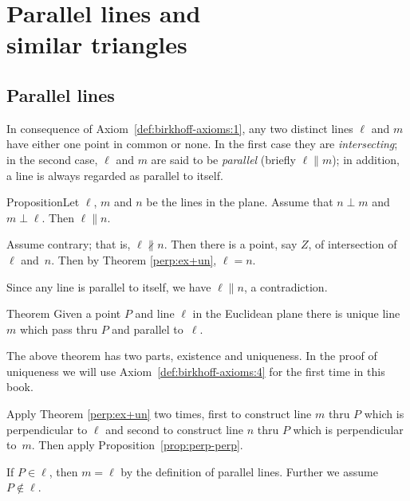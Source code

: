 \chapter[Parallel lines and similar triangles]{Parallel lines and\\ similar triangles}\label{chap:parallel}

\section*{Parallel lines}

In consequence of Axiom~\ref{def:birkhoff-axioms:1}, 
any two distinct lines $\ell$ and $m$ have either one point
in common or none. 
In the first case they are \emph{intersecting}; 
in the second case, $\ell$ and $m$ are said to be \emph{parallel} (briefly $\ell\parallel m$);
in addition, a line is always regarded as parallel to itself.


\begin{thm}{Proposition}\label{prop:perp-perp}Let $\ell$, $m$ and $n$ be the lines in the plane.
Assume that $n\perp m$ and $m\perp \ell$.
Then $\ell\parallel n$. 
\end{thm}

Assume contrary; 
that is, $\ell\nparallel n$.
Then there is a point, say $Z$, of intersection of $\ell$ and~$n$.
Then by Theorem \ref{perp:ex+un},
$\ell=n$.

Since any line is parallel to itself, we have $\ell\parallel n$, a contradiction.
\qeds

\begin{thm}{Theorem}\label{thm:parallel}
Given a point $P$ and line $\ell$ in the Euclidean plane
there is unique line $m$
which pass thru $P$ and parallel to~$\ell$.
\end{thm}

The above theorem has two parts, existence and uniqueness.
In the proof of uniqueness we will use Axiom~\ref{def:birkhoff-axioms:4} for the first time in this book.

Apply Theorem \ref{perp:ex+un} two times,
first to construct line $m$ thru $P$ which is perpendicular to $\ell$
and second to construct line $n$ thru $P$ which is perpendicular to~$m$.
Then apply Proposition~\ref{prop:perp-perp}.

If $P\in\ell$, then $m=\ell$ by the definition of parallel lines.
Further we assume $P\notin\ell$.

